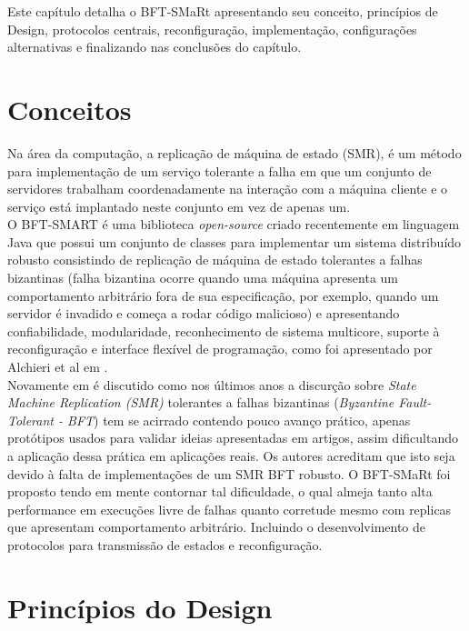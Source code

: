Este capítulo detalha o BFT-SMaRt apresentando seu conceito, princípios de Design, protocolos centrais, reconfiguração, implementação, configurações alternativas e finalizando nas conclusões do capítulo.


	\section{Conceitos}
	Na área da computação, a  replicação de máquina de estado (SMR), é um método para implementação de um serviço tolerante a falha em que um conjunto de servidores trabalham coordenadamente na interação com a máquina cliente e o serviço está implantado neste conjunto em vez de  apenas um. \\
	
	O BFT-SMART é uma biblioteca \textit{open-source} criado recentemente em linguagem Java que possui um conjunto de classes para implementar um sistema distribuído robusto consistindo de replicação de máquina de estado tolerantes a falhas bizantinas (falha bizantina ocorre quando uma máquina apresenta um comportamento arbitrário fora de sua especificação, por exemplo, quando um servidor é invadido e começa a rodar código malicioso) e apresentando confiabilidade, modularidade, reconhecimento de sistema multicore, suporte à reconfiguração e interface flexível de programação, como foi apresentado por Alchieri et al em \cite{bessani3}. \\
	
	Novamente em \cite{bessani3} é discutido como nos últimos anos a discurção sobre \textit{State Machine Replication (SMR)} tolerantes a falhas bizantinas (\textit{Byzantine Fault-Tolerant - BFT}) tem se acirrado contendo pouco avanço prático, apenas protótipos usados para validar ideias apresentadas em artigos, assim dificultando a aplicação dessa prática em aplicações reais. Os autores acreditam que isto seja devido à falta de implementações de um SMR BFT robusto. O BFT-SMaRt foi proposto tendo em mente contornar tal dificuldade, o qual almeja tanto alta performance em execuções livre de falhas quanto corretude mesmo com replicas que apresentam comportamento arbitrário. Incluindo o desenvolvimento de protocolos para transmissão de estados e reconfiguração. \\
	
	\section{Princípios do Design}
	

